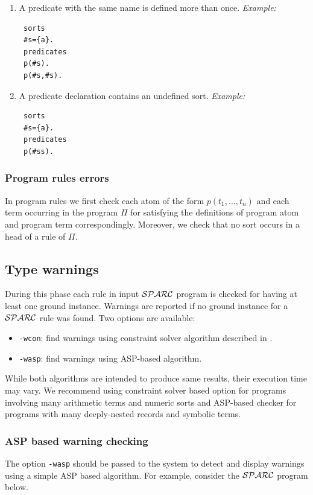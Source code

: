 \documentclass[12pt, letterpaper]{article}
\begin{document}
\begin{enumerate}
\item A predicate with the same name is defined more than once.
\textit{Example:}
\begin{verbatim}
 sorts
 #s={a}.
 predicates
 p(#s).
 p(#s,#s).
\end{verbatim}
\item A predicate declaration contains an undefined sort.
\textit{Example:}
\begin{verbatim}
 sorts
 #s={a}.
 predicates
 p(#ss).
\end{verbatim}
\end{enumerate}
\subsubsection{Program rules errors}

In program rules we first check each atom of the form $p(t_1,\dots,t_n)$ and each term occurring in the program $\Pi$ for satisfying
the definitions of program atom and program term correspondingly\cite{sparc}. Moreover, we check that no sort occurs in a head of a rule of $\Pi$.
\subsection{Type warnings}\label{type_warnings}
During this phase each rule in input ${\cal SPARC}$ program is checked for having at least one ground instance. Warnings are reported if no ground instance for a ${\cal SPARC}$ rule was found.  Two options are available:
\begin{itemize}
\item \texttt{-wcon}: find warnings using  constraint solver algorithm described in \cite{sparc}. 
\item \texttt{-wasp}: find warnings using ASP-based algorithm.
\end{itemize}

While both algorithms are intended to produce same results, their execution time may vary. We recommend using constraint solver based option for programs involving many arithmetic terms and numeric sorts and ASP-based checker for programs with many deeply-nested records and symbolic terms.     

\subsubsection{ASP based warning checking} \label{asp_type_warnings}
The option \texttt{-wasp} should be passed to the  system  to detect and display warnings using a simple ASP based algorithm.
For example, consider the ${\cal SPARC}$ program below.
\end{document}
